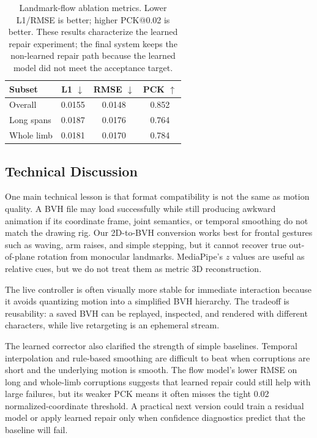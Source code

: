 \documentclass[10pt,twocolumn,letterpaper]{article}
\begin{document}
\begin{table}[t]
\begin{center}
\scriptsize
\begin{tabular}{lccc}
\toprule
Subset & L1 $\downarrow$ & RMSE $\downarrow$ & PCK $\uparrow$ \\
\midrule
Overall & 0.0155 & 0.0148 & 0.852 \\
Long spans & 0.0187 & 0.0176 & 0.764 \\
Whole limb & 0.0181 & 0.0170 & 0.784 \\
\bottomrule
\end{tabular}
\end{center}
\caption{Landmark-flow ablation metrics. Lower L1/RMSE is better; higher PCK@0.02 is better. These results characterize the learned repair experiment; the final system keeps the non-learned repair path because the learned model did not meet the acceptance target.}
\label{tab:flow-results}
\end{table}

\subsection{Technical Discussion}

One main technical lesson is that format compatibility is not the same as motion quality. A BVH file may load successfully while still producing awkward animation if its coordinate frame, joint semantics, or temporal smoothing do not match the drawing rig. Our 2D-to-BVH conversion works best for frontal gestures such as waving, arm raises, and simple stepping, but it cannot recover true out-of-plane rotation from monocular landmarks. MediaPipe's $z$ values are useful as relative cues, but we do not treat them as metric 3D reconstruction.

The live controller is often visually more stable for immediate interaction because it avoids quantizing motion into a simplified BVH hierarchy. The tradeoff is reusability: a saved BVH can be replayed, inspected, and rendered with different characters, while live retargeting is an ephemeral stream.

The learned corrector also clarified the strength of simple baselines. Temporal interpolation and rule-based smoothing are difficult to beat when corruptions are short and the underlying motion is smooth. The flow model's lower RMSE on long and whole-limb corruptions suggests that learned repair could still help with large failures, but its weaker PCK means it often misses the tight 0.02 normalized-coordinate threshold. A practical next version could train a residual model or apply learned repair only when confidence diagnostics predict that the baseline will fail.
\end{document}
